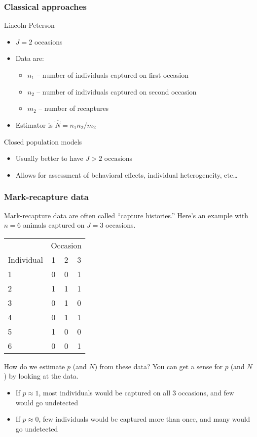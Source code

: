 \documentclass[color=usenames,dvipsnames]{beamer}\usepackage[]{graphicx}\usepackage[]{xcolor}
\begin{document}
\begin{frame}
  \frametitle{Classical approaches}
  Lincoln-Peterson  \\
  \begin{itemize}
    \item $J=2$ occasions
    \item Data are:
      \begin{itemize}
        \item $n_1$ -- number of individuals captured on first occasion
        \item $n_2$ -- number of individuals captured on second occasion
        \item $m_2$ -- number of recaptures
      \end{itemize}
    \item Estimator is $\hat{N} = n_1n_2/m_2$  
  \end{itemize}
  \pause
  \vfill
  Closed population models \\
  \begin{itemize}
    \item Usually better to have $J>2$ occasions
    \item Allows for assessment of behavioral effects, individual heterogeneity, etc\dots
  \end{itemize}
\end{frame}



\begin{frame}
  \frametitle{Mark-recapture data}
  \small
  Mark-recapture data are often called ``capture histories.'' Here's
  an example with $n=6$ animals captured on $J=3$ occasions. \\
  \centering
  \begin{tabular}{lccc}
    \hline
    & \multicolumn{3}{c}{Occasion} \\
    \cline{2-4}
    Individual & 1 & 2 & 3 \\
    \hline
    1 & 0 & 0 & 1 \\
    2 & 1 & 1 & 1 \\
    3 & 0 & 1 & 0 \\
    4 & 0 & 1 & 1 \\
    5 & 1 & 0 & 0 \\
    6 & 0 & 0 & 1 \\
    \hline
  \end{tabular}
  \pause
  \vfill
  \flushleft
  How do we estimate $p$ (and $N$) from these data? %
  \pause
  You can get a sense for $p$ (and $N$) by looking at the data.
  \begin{itemize}
    \setlength\itemsep{.1pt}
    \item If $p\approx 1$, most individuals would be captured
      on all 3 occasions, and few would go undetected
    \item If $p\approx 0$, few individuals would be captured 
      more than once, and many would go undetected
  \end{itemize}
\end{frame}
\end{document}
